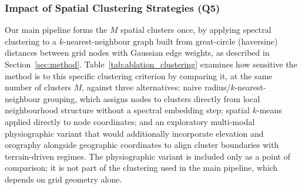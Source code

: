 \documentclass[preprint,12pt]{elsarticle}
\begin{document}

\subsubsection{Impact of Spatial Clustering Strategies (Q5)}
\label{sec:ablation_clustering}

Our main pipeline forms the $M$ spatial clusters once, by applying spectral clustering \citep{ng2002spectral,vonluxburg2007tutorial} to a $k$-nearest-neighbour graph built from great-circle (haversine) distances between grid nodes with Gaussian edge weights, as described in Section~\ref{sec:method}. Table~\ref{tab:ablation_clustering} examines how sensitive the method is to this specific clustering criterion by comparing it, at the same number of clusters $M$, against three alternatives: naive radius/$k$-nearest-neighbour grouping, which assigns nodes to clusters directly from local neighbourhood structure without a spectral embedding step; spatial $k$-means applied directly to node coordinates; and an exploratory multi-modal physiographic variant that would additionally incorporate elevation and orography alongside geographic coordinates to align cluster boundaries with terrain-driven regimes. The physiographic variant is included only as a point of comparison; it is not part of the clustering used in the main pipeline, which depends on grid geometry alone.
\end{document}

